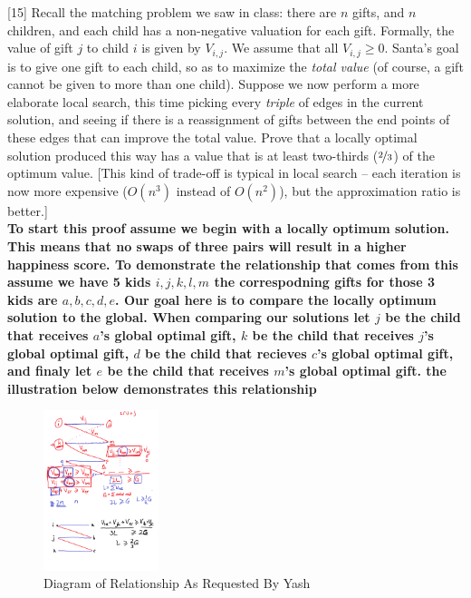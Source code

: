 \documentclass[addpoints]{exam}
\begin{document}
\begin{questions}
[15]
Recall the matching problem we saw in class: there are $n$ gifts, and $n$ children,
and each child has a non-negative valuation for each gift. Formally, the value of
gift $j$ to child $i$ is given by $V_{i,j}$. We assume that all $V_{i,j} \ge 0$.
Santa's goal is to give one gift to each child, so as to maximize the {\em total
value} (of course, a gift cannot be given to more than one child).
Suppose we now perform a more elaborate local search, this time picking every {\em
triple} of edges in the current solution, and seeing if there is a reassignment of
gifts between the end points of these edges that can improve the total value. Prove
that a locally optimal solution produced this way has a value that is at least two-thirds ($\nicefrac{2}{3}$) of the optimum value. [This kind of trade-off is typical in local search --
each iteration is now more expensive ($O(n^3)$ instead of $O(n^2)$), but the
approximation ratio is better.]\\

\textbf{To start this proof assume we begin with a locally optimum solution. This means that no swaps of three pairs will result in a higher happiness score. To demonstrate the relationship that comes from this assume we have 5 kids $i,j,k,l,m$ the correspodning gifts for those 3 kids are $a,b,c,d,e$. Our goal here is to compare the locally optimum solution to the global. When comparing our solutions let $j$ be the child that receives $a$'s global optimal gift, $k$ be the child that receives $j$'s global optimal gift, $d$ be the child that recieves $c$'s global optimal gift, and finaly let $e$ be the child that receives $m$'s global optimal gift. the illustration below demonstrates this relationship}
 \begin{figure}[H]
 \centering
  \includegraphics[width=0.3\textwidth]{Gift Giving.png}
 \caption{Diagram of Relationship As Requested By Yash}
 \end{figure}


\end{questions}
\end{document}
